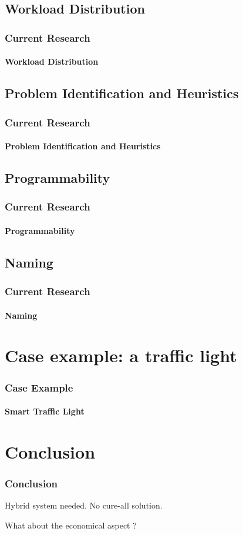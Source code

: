 \documentclass[utf8,xcolor=table, page number]{earlywinter}
\begin{document}
\subsection{Workload Distribution}
\begin{frame}
  \frametitle{Current Research}
  \framesubtitle{Workload Distribution}
\end{frame}
\subsection{Problem Identification and Heuristics}
\begin{frame}
  \frametitle{Current Research}
  \framesubtitle{Problem Identification and Heuristics}
\end{frame}
\subsection{Programmability}
\begin{frame}
  \frametitle{Current Research}
  \framesubtitle{Programmability}
\end{frame}
\subsection{Naming}
\begin{frame}
  \frametitle{Current Research}
  \framesubtitle{Naming}
\end{frame}

\section{Case example: a traffic light}
\begin{frame}
  \frametitle{Case Example}
  \framesubtitle{Smart Traffic Light}
\end{frame}
\section{Conclusion}
\begin{frame}
  \frametitle{Conclusion}
  Hybrid system needed.
  No cure-all solution.
  
  What about the economical aspect ?
  
\end{frame}
\end{document}
